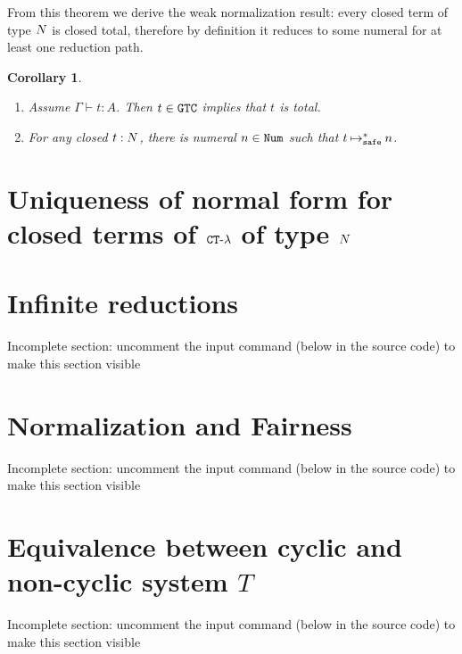 \documentclass{article}
\newtheorem{corollary}[theorem]{Corollary}
\begin{document}
From this theorem we derive the weak normalization result: 
every closed term of type ${N}$ is closed total, therefore by definition it reduces to some numeral for at least
one reduction path. 

\begin{corollary}\label{cor:WN_typeN}
  \begin {enumerate}
  \item
   Assume  $\Gamma\vdash t:A$. Then $t \in {\tt GTC}$ implies that $t$ is total.
  \item
    For any closed $t:{N}$, there is numeral $n\in{\tt Num}$ such that $t\mathbin{\mathbin{\mapsto}_{\hbox{\scriptsize \tt safe}}^*} n$. 
  \end{enumerate}
\end{corollary}



\section{Uniqueness of normal form for closed terms of ${ {\tt CT} \mbox{-} \lambda}$ of type ${N}$}
\label{section-uniqueness-normal-form}



\section{Infinite reductions}
\label{section-infinite-reductions}
{Incomplete section: uncomment the input command (below in the source code) to make this section visible}




\section{Normalization and Fairness}
\label{section-normalization-fairness}
{Incomplete section: uncomment the input command (below in the source code) to make this section visible}



\section{Equivalence between cyclic and non-cyclic system $T$} 
\label{section-equivalence-cyclic-non-cyclic-T}
{Incomplete section: uncomment the input command (below in the source code) to make this section visible}

\end{document}
